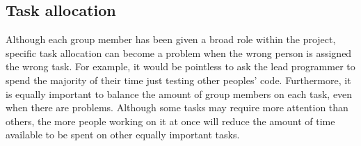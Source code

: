\documentclass[a4paper]{article}
\begin{document}
\subsection{Task allocation}

Although each group member has been given a broad role within the project, specific task allocation can become a problem when the wrong person is assigned the wrong task. For example, it would be pointless to ask the lead programmer to spend the majority of their time just testing other peoples' code. Furthermore, it is equally important to balance the amount of group members on each task, even when there are problems. Although some tasks may require more attention than others, the more people working on it at once will reduce the amount of time available to be spent on other equally important tasks.
\clearpage
\end{document}
